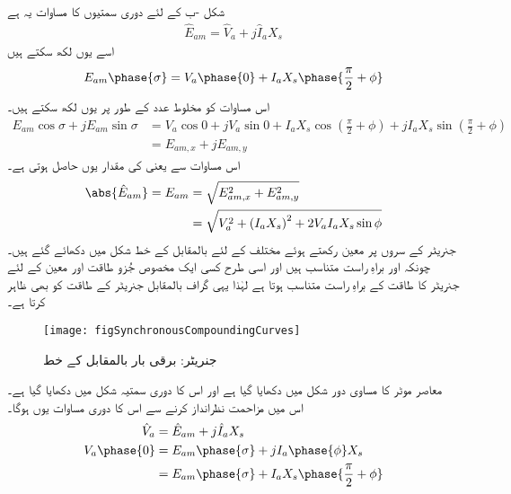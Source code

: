 %
شکل -ب کے لئے دوری سمتیوں کا مساوات یہ ہے
\begin{align}
\hat{E}_{am}=\hat{V}_a+j \hat{I}_a X_s
\end{align}
اسے یوں لکھ سکتے ہیں
\begin{align}
E_{am}\phase{\sigma}=V_a \phase{0} +I_a X_s \phase{\frac{\pi}{2}+\phi}
\end{align}
اس مساوات کو مخلوط عدد کے طور پر یوں لکھ سکتے ہیں۔
\begin{align*}
E_{am} \cos \sigma +j E_{am} \sin \sigma&=V_a \cos 0+j V_a \sin 0 + I_a X_s \cos \left(\frac{\pi}{2}+\phi \right)+j I_a X_s \sin \left(\frac{\pi}{2}+\phi \right)\\
&=E_{am,x}+j E_{am,y}
\end{align*}
اس مساوات سے  یعنی  کی مقدار یوں حاصل ہوتی ہے۔
\begin{gather}
\begin{aligned}
\abs{\hat{E}_{am}}=E_{am}&=\sqrt{E_{am,x}^2+E_{am,y}^2}\\
&=\sqrt{V_a^2+\left(I_a X_s\right)^2 +2 V_a I_a X_s \sin \phi}
\end{aligned}
\end{gather}
جنریٹر کے سروں پر معین  رکھتے ہوئے مختلف  کے لئے  بالمقابل  کے خط شکل   میں دکھائے گئے ہیں۔ چونکہ   اور   براہِ راست متناسب ہیں اور اسی طرح کسی ایک مخصوص جُزو طاقت اور معین  کے لئے جنریٹر کا طاقت  کے  براہِ راست متناسب ہوتا ہے لہٰذا یہی گراف  بالمقابل جنریٹر کے طاقت کو بھی ظاہر کرتا ہے۔
\begin{figure}
\centering
\texttt{[image: figSynchronousCompoundingCurves]}
\caption{جنریٹر: برقی بار بالمقابل  کے خط}
\label{شکل_معاصر_بار_بالمقابل_میدانی_رو}
\end{figure}
معاصر موٹر کا مساوی دور شکل   میں دکھایا گیا ہے اور اس کا دوری سمتیہ شکل   میں دکھایا گیا ہے۔ اس میں مزاحمت نظرانداز کرنے سے اس کا دوری مساوات یوں ہوگا۔
\begin{gather}
\begin{aligned}
\hat{V}_a&=\hat{E}_{am}+j \hat{I}_a X_s\\
V_a \phase{0}&=E_{am} \phase{\sigma} +j I_a \phase{\phi} X_s\\
&=E_{am} \phase{\sigma} +I_a X_s \phase{\frac{\pi}{2}+\phi}
\end{aligned}
\end{gather}
